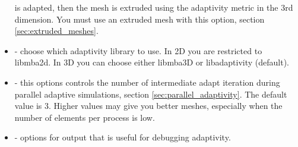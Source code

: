 \begin{itemize}
is adapted, then the mesh is extruded using the adaptivity metric in the 3rd dimension. You must use an extruded mesh with this option, section \ref{sec:extruded_meshes}.
\item {} - choose which adaptivity library to use. In 2D you are restricted to libmba2d. In 3D you can choose either libmba3D or libadaptivity (default).
\item {} - this options controls the number of intermediate adapt iteration during parallel adaptive simulations, section \ref{sec:parallel_adaptivity}. The default value is 3. Higher values may give you 
better meshes, especially when the number of elements per process is low.
\item {} - options for output that is useful for debugging adaptivity.
\end{itemize}

